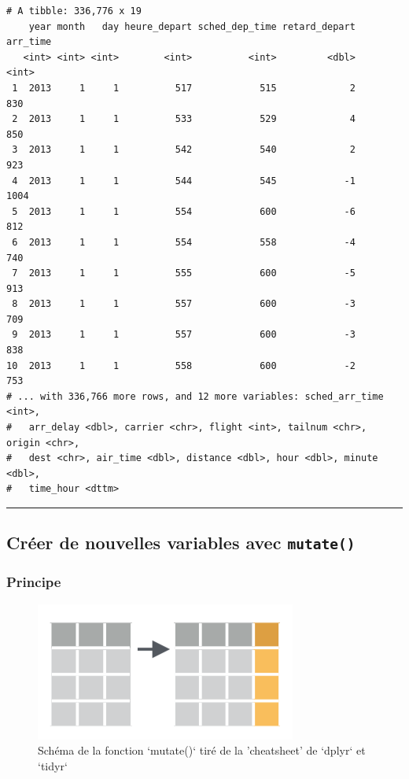 \documentclass[a4paperpaper,]{article}
\theoremstyle{definition}
\theoremstyle{definition}
\theoremstyle{definition}
\theoremstyle{remark}
\begin{document}
\begin{verbatim}
# A tibble: 336,776 x 19
    year month   day heure_depart sched_dep_time retard_depart arr_time
   <int> <int> <int>        <int>          <int>         <dbl>    <int>
 1  2013     1     1          517            515             2      830
 2  2013     1     1          533            529             4      850
 3  2013     1     1          542            540             2      923
 4  2013     1     1          544            545            -1     1004
 5  2013     1     1          554            600            -6      812
 6  2013     1     1          554            558            -4      740
 7  2013     1     1          555            600            -5      913
 8  2013     1     1          557            600            -3      709
 9  2013     1     1          557            600            -3      838
10  2013     1     1          558            600            -2      753
# ... with 336,766 more rows, and 12 more variables: sched_arr_time <int>,
#   arr_delay <dbl>, carrier <chr>, flight <int>, tailnum <chr>, origin <chr>,
#   dest <chr>, air_time <dbl>, distance <dbl>, hour <dbl>, minute <dbl>,
#   time_hour <dttm>
\end{verbatim}

\begin{center}\rule{0.5\linewidth}{\linethickness}\end{center}

\hypertarget{creer-de-nouvelles-variables-avec-mutate}{%
\subsection{\texorpdfstring{Créer de nouvelles variables avec
\texttt{mutate()}}{Créer de nouvelles variables avec mutate()}}\label{creer-de-nouvelles-variables-avec-mutate}}

\hypertarget{principe-1}{%
\subsubsection{Principe}\label{principe-1}}

\begin{figure}[htpb]

{\centering \includegraphics[width=0.5\linewidth]{images/mutate} 

}

\caption{Schéma de la fonction `mutate()` tiré de la 'cheatsheet' de `dplyr` et `tidyr`}\label{fig:mutatefig}
\end{figure}
\end{document}
